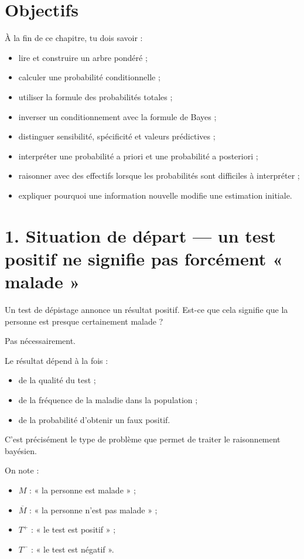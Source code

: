 
\section{Objectifs}

À la fin de ce chapitre, tu dois savoir :

\begin{itemize}
\item lire et construire un arbre pondéré ;
\item calculer une probabilité conditionnelle ;
\item utiliser la formule des probabilités totales ;
\item inverser un conditionnement avec la formule de Bayes ;
\item distinguer sensibilité, spécificité et valeurs prédictives ;
\item interpréter une probabilité a priori et une probabilité a posteriori ;
\item raisonner avec des effectifs lorsque les probabilités sont difficiles à interpréter ;
\item expliquer pourquoi une information nouvelle modifie une estimation initiale.
\end{itemize}


\section{1. Situation de départ — un test positif ne signifie pas forcément « malade »}

Un test de dépistage annonce un résultat positif. Est-ce que cela signifie que la personne est presque certainement malade ?

Pas nécessairement.

Le résultat dépend à la fois :

\begin{itemize}
\item de la qualité du test ;
\item de la fréquence de la maladie dans la population ;
\item de la probabilité d'obtenir un faux positif.
\end{itemize}

C'est précisément le type de problème que permet de traiter le raisonnement bayésien.

On note :

\begin{itemize}
\item $M$ : « la personne est malade » ;
\item $\overline M$ : « la personne n'est pas malade » ;
\item $T^+$ : « le test est positif » ;
\item $T^-$ : « le test est négatif ».
\end{itemize}

